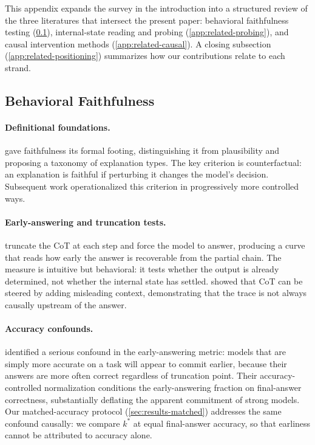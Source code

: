 \documentclass[11pt]{article}
\newcommand{\stepk}{k}
\begin{document}
This appendix expands the survey in the introduction into a structured review of
the three literatures that intersect the present paper: behavioral faithfulness
testing (\cref{app:related-behavioral}), internal-state reading and probing
(\cref{app:related-probing}), and causal intervention methods
(\cref{app:related-causal}). A closing subsection
(\cref{app:related-positioning}) summarizes how our contributions relate to each
strand.

\subsection{Behavioral Faithfulness}
\label{app:related-behavioral}

\paragraph{Definitional foundations.}
\citet{DBLP:conf/acl/JacoviG20} gave faithfulness its formal footing,
distinguishing it from plausibility and proposing a taxonomy of explanation
types. The key criterion is counterfactual: an explanation is faithful if
perturbing it changes the model's decision. Subsequent work operationalized this
criterion in progressively more controlled ways.

\paragraph{Early-answering and truncation tests.}
\citet{DBLP:journals/corr/abs-2307-13702} truncate the CoT at each
step and force the model to answer, producing a curve that reads how early the
answer is recoverable from the partial chain. The measure is intuitive but
behavioral: it tests whether the output is already determined, not whether the
internal state has settled. \citet{DBLP:conf/nips/TurpinMPB23} showed that CoT
can be steered by adding misleading context, demonstrating that the trace is not
always causally upstream of the answer.

\paragraph{Accuracy confounds.}
\citet{DBLP:journals/tmlr/BenthamSM24} identified a serious confound in the
early-answering metric: models that are simply more accurate on a task will
appear to commit earlier, because their answers are more often correct regardless
of truncation point. Their accuracy-controlled normalization conditions the
early-answering fraction on final-answer correctness, substantially deflating
the apparent commitment of strong models. Our matched-accuracy protocol
(\cref{sec:results-matched}) addresses the same confound causally: we compare
$\stepk^{*}$ at equal final-answer accuracy, so that earliness cannot be
attributed to accuracy alone.
\end{document}
